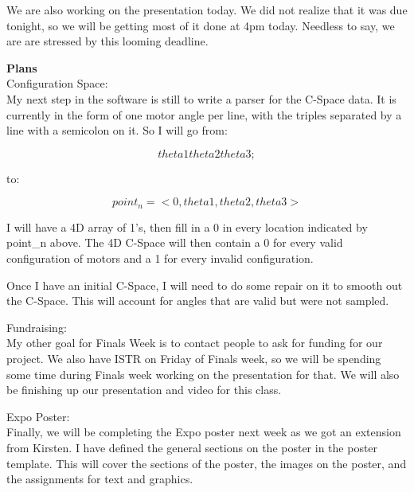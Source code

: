 We are also working on the presentation today. We did not realize that it was due tonight, so we will be getting most of it done at 4pm today. Needless to say, we are are stressed by this looming deadline.

\textbf{Plans} \\ 
Configuration Space: \\ 
My next step in the software is still to write a parser for the C-Space data. It is currently in the form of one motor angle per line, with the triples separated by a line with a semicolon on it. So I will go from:

\[ theta1 theta2 theta3 ; \]

to:

\[ point_n = <0, theta1, theta2, theta3> \]

I will have a 4D array of 1's, then fill in a 0 in every location indicated by point\_n above. The 4D C-Space will then contain a 0 for every valid configuration of motors and a 1 for every invalid configuration.

Once I have an initial C-Space, I will need to do some repair on it to smooth out the C-Space. This will account for angles that are valid but were not sampled.

Fundraising: \\ 
My other goal for Finals Week is to contact people to ask for funding for our project. We also have ISTR on Friday of Finals week, so we will be spending some time during Finals week working on the presentation for that. We will also be finishing up our presentation and video for this class.

Expo Poster: \\ 
Finally, we will be completing the Expo poster next week as we got an extension from Kirsten. I have defined the general sections on the poster in the poster template. This will cover the sections of the poster, the images on the poster, and the assignments for text and graphics.


